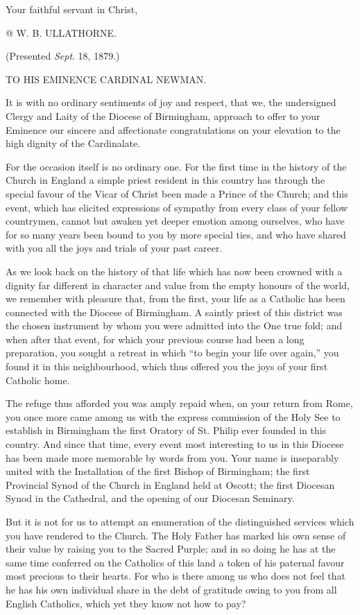 Your faithful servant in Christ,

@ W. B. ULLATHORNE.


(Presented \emph{Sept}. 18, 1879.)

TO HIS EMINENCE
CARDINAL NEWMAN.

It is with no ordinary sentiments of joy and respect, that we, the
undersigned Clergy and Laity of the Diocese of Birmingham, approach to
offer to your Eminence our sincere and affectionate congratulations on
your elevation to the high dignity of the Cardinalate.

For the occasion itself is no ordinary one. For the first time in
the history of the Church in England a simple priest resident in this
country has through the special favour of the Vicar of Christ been
made a Prince of the Church; and this event, which has elicited
expressions of sympathy from every class of your fellow countrymen,
cannot but awaken yet deeper emotion among ourselves, who have for so
many years been bound to you by more special ties, and who have
shared with you all the joys and trials of your past career.

As we look back on the history of that life which has now been
crowned with a dignity far different in character and value from the
empty honours of the world, we remember with pleasure that, from the
first, your life as a Catholic has been connected with the Diocese of
Birmingham. A saintly priest of this district was the chosen
instrument by whom you were admitted into the One true fold; and when
after that event, for which your previous course had been a long
preparation, you sought a retreat in which ``to begin your life
over again,'' you found it in this neighbourhood, which thus
offered you the joys of your first Catholic home.

The refuge thus afforded you was amply repaid when, on your return
from Rome, you once more came among us with the express commission of
the Holy See to establish in Birmingham the first Oratory of St.
Philip ever founded in this country. And since that time, every event
most interesting to us in this Diocese has been made more memorable by
words from you. Your name is inseparably united with the Installation
of the first Bishop of Birmingham; the first Provincial Synod of the
Church in England held at Oscott; the first Diocesan Synod in the
Cathedral, and the opening of our Diocesan Seminary.

But it is not for us to attempt an enumeration of the distinguished
services which you have rendered to the Church. The Holy Father has
marked his own sense of their value by raising you to the Sacred
Purple; and in so doing he has at the same time conferred on the
Catholics of this land a token of his paternal favour most precious to
their hearts. For who is there among us who does not feel that he has
his own individual share in the debt of gratitude owing to you from
all English Catholics, which yet they know not how to pay?

